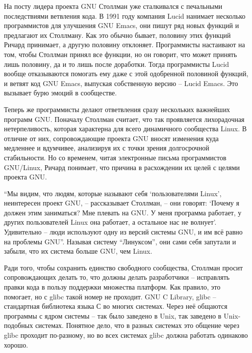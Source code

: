 На посту лидера проекта GNU Столлман уже сталкивался с печальными последствиями ветвления кода. В 1991 году компания Lucid нанимает несколько программистов для улучшения GNU Emacs, они пишут ряд новых функций и предлагают их Столлману. Как это обычно бывает, половину этих функций Ричард принимает, а другую половину отклоняет. Программисты настаивают на том, чтобы Столлман принял все функции, но он говорит, что может принять лишь половину, да и то лишь после доработки. Тогда программисты Lucid вообще отказываются помогать ему даже с этой одобренной половиной функций, и ветвят код GNU Emacs, выпуская собственную версию -- Lucid Emacs. Это вызывает бурю эмоций в сообществе.

Теперь же программисты делают ответвления сразу нескольких важнейших программ GNU. Поначалу Столлман считает, что так проявляется лихорадочная нетерпеливость, которая характерна для всего динамичного сообщества Linux. В отличие от них, сопровождающие проекта GNU вносят изменения куда медленнее и вдумчивее, анализируя их с точки зрения долгосрочной стабильности. Но со временем, читая электронные письма программистов GNU/Linux, Ричард понимает, что причина в расхождении их целей с целями проекта GNU.

\enquote{Мы видим, что людям, которые называют себя \enquote{пользователями Linux}, неинтересен проект GNU, -- рассказывает Столлман, -- они говорят: \enquote{Почему я должен этим заниматься? Мне плевать на GNU. У меня программа работает, у других пользователей Linux она работает, а остальное нас не волнует}. Удивительно -- люди используют одну из версий системы GNU, и им всё равно на проблемы GNU}. Называя систему \enquote{Линуксом}, они сами себя запутали и забыли, что их система больше GNU, чем Linux.

Ради того, чтобы сохранить единство свободного сообщества, Столлман просит сопровождающих делать то, что должны делать разработчики -- исправлять правки кода в пользу поддержки множества платформ. Как правило, это помогает, но с glibc такой номер не проходит. GNU C Library, glibc -- стандартная библиотека языка С во многих системах. Через неё общаются программы с ядром системы -- так было заведено в Unix, так заведено в Unix-подобных системах. Понятное дело, что в разных системах это общение через glibc проходит по-разному, но во всех системах glibc должна работать одинаково хорошо.

